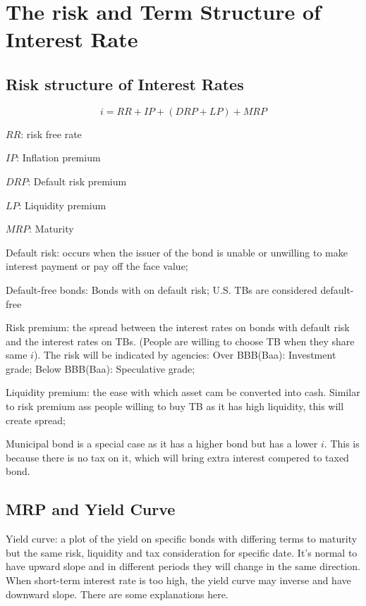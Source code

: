 \documentclass[10pt, a4paper]{article}
\begin{document}
\section{The risk and Term Structure of Interest Rate} 
\subsection{Risk structure of Interest Rates}
$$i = RR + IP + (DRP + LP) + MRP$$

\begin{center}
    $RR$: risk free rate 
    
    $IP$:  Inflation premium
    
    $DRP$: Default risk premium

    $LP$: Liquidity premium

    $MRP$: Maturity 
\end{center}

    Default risk: occurs when the issuer of the bond is unable or unwilling to make interest payment or pay off the face value; 

    Default-free bonds: Bonds with on default risk; U.S. TBs are considered default-free 

    \medskip
    
    Risk premium: the spread between the interest rates on bonds with default risk and the interest rates on TBs. (People are willing to choose TB when they share same $i$). The risk will be indicated by agencies: Over BBB(Baa): Investment grade; Below BBB(Baa): Speculative grade;   

    Liquidity premium: the ease with which asset cam be converted into cash. Similar to risk premium ass people willing to buy TB as it has high liquidity, this will create spread;
    
    Municipal bond is a special case as it has a higher bond but has a lower $i$. This is because there is no tax on it, which will bring extra interest compered to taxed bond.  
    \medskip
\subsection{MRP and Yield Curve}
    Yield curve: a plot of the yield on specific bonds with differing terms to maturity  but the same risk, liquidity  and tax consideration for specific date. It's normal to have upward slope and in different periods they will change in the same direction. When short-term interest rate is too high, the yield curve may inverse and have downward slope. There are some explanations here. 
\end{document}

